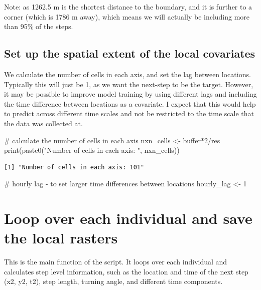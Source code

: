 \documentclass[
  letterpaper,
  DIV=11,
  numbers=noendperiod]{scrartcl}
\newenvironment{Shaded}{\begin{snugshade}}{\end{snugshade}}
\newcommand{\CommentTok}[1]{\textcolor[rgb]{0.37,0.37,0.37}{#1}}
\newcommand{\DecValTok}[1]{\textcolor[rgb]{0.68,0.00,0.00}{#1}}
\newcommand{\FunctionTok}[1]{\textcolor[rgb]{0.28,0.35,0.67}{#1}}
\newcommand{\NormalTok}[1]{\textcolor[rgb]{0.00,0.23,0.31}{#1}}
\newcommand{\OtherTok}[1]{\textcolor[rgb]{0.00,0.23,0.31}{#1}}
\newcommand{\SpecialCharTok}[1]{\textcolor[rgb]{0.37,0.37,0.37}{#1}}
\newcommand{\StringTok}[1]{\textcolor[rgb]{0.13,0.47,0.30}{#1}}
\begin{document}
Note: as 1262.5 m is the shortest distance to the boundary, and it is
further to a corner (which is 1786 m away), which means we will actually
be including more than 95\% of the steps.

\subsection{Set up the spatial extent of the local
covariates}\label{set-up-the-spatial-extent-of-the-local-covariates}

We calculate the number of cells in each axis, and set the lag between
locations. Typically this will just be 1, as we want the next-step to be
the target. However, it may be possible to improve model training by
using different lags and including the time difference between locations
as a covariate. I expect that this would help to predict across
different time scales and not be restricted to the time scale that the
data was collected at.

\begin{Shaded}
\begin{Highlighting}[]
\CommentTok{\# calculate the number of cells in each axis}
\NormalTok{nxn\_cells }\OtherTok{\textless{}{-}}\NormalTok{ buffer}\SpecialCharTok{*}\DecValTok{2}\SpecialCharTok{/}\NormalTok{res}
\FunctionTok{print}\NormalTok{(}\FunctionTok{paste0}\NormalTok{(}\StringTok{"Number of cells in each axis: "}\NormalTok{, nxn\_cells))}
\end{Highlighting}
\end{Shaded}

\begin{verbatim}
[1] "Number of cells in each axis: 101"
\end{verbatim}

\begin{Shaded}
\begin{Highlighting}[]
\CommentTok{\# hourly lag {-} to set larger time differences between locations}
\NormalTok{hourly\_lag }\OtherTok{\textless{}{-}} \DecValTok{1}
\end{Highlighting}
\end{Shaded}

\section{Loop over each individual and save the local
rasters}\label{loop-over-each-individual-and-save-the-local-rasters}

This is the main function of the script. It loops over each individual
and calculates step level information, such as the location and time of
the next step (x2, y2, t2), step length, turning angle, and different
time components.
\end{document}
